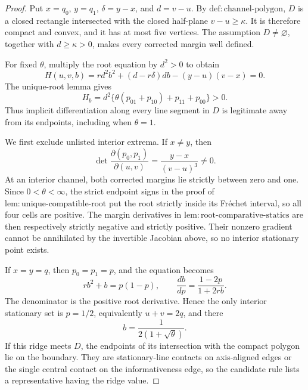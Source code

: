 \documentclass{article}
\begin{document}
\begin{proof}
Put \(x=q_0\), \(y=q_1\), \(\delta=y-x\), and \(d=v-u\). By \(\mathrm{def:channel\text{-}polygon}\), \(D\) is a closed rectangle intersected with the closed half-plane \(v-u\geq\kappa\). It is therefore compact and convex, and it has at most five vertices. The assumption \(D\neq\varnothing\), together with \(d\geq\kappa>0\), makes every corrected margin well defined.

For fixed \(\theta\), multiply the root equation by \(d^2>0\) to obtain
\[
H(u,v,b)
=r d^2b^2+(d-r\delta)d b-(y-u)(v-x)=0.
\]
The unique-root lemma gives
\[
H_b=d^2\{\theta(p_{01}+p_{10})+p_{11}+p_{00}\}>0.
\]
Thus implicit differentiation along every line segment in \(D\) is legitimate away from its endpoints, including when \(\theta=1\).

We first exclude unlisted interior extrema. If \(x\neq y\), then
\[
\det\frac{\partial(p_0,p_1)}{\partial(u,v)}
=\frac{y-x}{(v-u)^3}\neq0.
\]
At an interior channel, both corrected margins lie strictly between zero and one. Since \(0<\theta<\infty\), the strict endpoint signs in the proof of \(\mathrm{lem:unique\text{-}compatible\text{-}root}\) put the root strictly inside its Fr\'echet interval, so all four cells are positive. The margin derivatives in \(\mathrm{lem:root\text{-}comparative\text{-}statics}\) are then respectively strictly negative and strictly positive. Their nonzero gradient cannot be annihilated by the invertible Jacobian above, so no interior stationary point exists.

If \(x=y=q\), then \(p_0=p_1=p\), and the equation becomes
\[
r b^2+b=p(1-p),
\qquad
\frac{db}{dp}=\frac{1-2p}{1+2rb}.
\]
The denominator is the positive root derivative. Hence the only interior stationary set is \(p=1/2\), equivalently \(u+v=2q\), and there
\[
b=\frac{1}{2(1+\sqrt\theta)}.
\]
If this ridge meets \(D\), the endpoints of its intersection with the compact polygon lie on the boundary. They are stationary-line contacts on axis-aligned edges or the single central contact on the informativeness edge, so the candidate rule lists a representative having the ridge value.


\end{proof}
\end{document}
